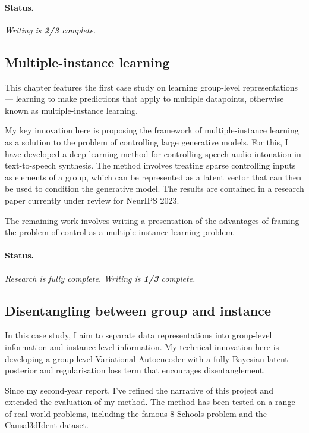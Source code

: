 \documentclass[a4paper]{article}
\begin{document}
\paragraph{Status.} \textit{Writing is \textbf{2/3} complete.}

\subsection{Multiple-instance learning}

This chapter features the first case study on learning group-level representations --- learning to make predictions that apply to multiple datapoints, otherwise known as multiple-instance learning. 

My key innovation here is proposing the framework of multiple-instance learning as a solution to the problem of controlling large generative models. For this, I have developed a deep learning method for controlling speech audio intonation in text-to-speech synthesis. The method involves treating sparse controlling inputs as elements of a group, which can be represented as a latent vector that can then be used to condition the generative model. The results are contained in a research paper currently under review for NeurIPS 2023. 

The remaining work involves writing a presentation of the advantages of framing the problem of control as a multiple-instance learning problem.

\paragraph{Status.} \textit{Research is fully complete. Writing is \textbf{1/3} complete.}

\subsection{Disentangling between group and instance}

In this case study, I aim to separate data representations into group-level information and instance level information. My technical innovation here is developing a group-level Variational Autoencoder with a fully Bayesian latent posterior and regularisation loss term that encourages disentanglement.

Since my second-year report, I've refined the narrative of this project and extended the evaluation of my method. The method has been tested on a range of real-world problems, including the famous 8-Schools problem and the Causal3dIdent dataset.
\end{document}
